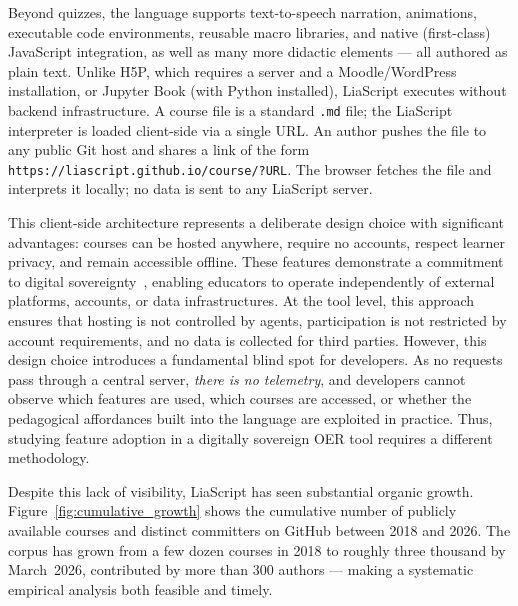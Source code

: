 
Beyond quizzes, the language supports text-to-speech narration, animations,
executable code environments, reusable macro libraries, and native (first-class) JavaScript integration, as well as many more didactic elements --- all authored as plain text.
Unlike H5P, which requires a server and a Moodle/WordPress installation,
or Jupyter Book (with Python installed),
LiaScript executes without backend infrastructure.
A course file is a standard \texttt{.md} file; the LiaScript interpreter
is loaded client-side via a single URL.
An author pushes the file to any public Git host
and shares a link of the form \texttt{https://liascript.github.io/course/?URL}.
The browser fetches the file and interprets it locally;
no data is sent to any LiaScript server.

This client-side architecture represents a deliberate design choice with significant
advantages: courses can be hosted anywhere, require no accounts, respect
learner privacy, and remain accessible offline. These features demonstrate a commitment to digital sovereignty~\cite{SchoenEbner2025,Ebner2026}, enabling educators to operate independently of external platforms, accounts, or data infrastructures. At the tool level, this approach ensures that hosting is not controlled by agents, participation is not restricted by account requirements, and no data is collected for third parties.
However, this design choice introduces a fundamental blind spot for developers. As no requests pass through a central server, \emph{there is no telemetry}, and developers cannot observe which features are used, which courses are
accessed, or whether the pedagogical affordances built into the language
are exploited in practice. Thus, studying feature adoption in a digitally sovereign OER tool requires a different methodology.

Despite this lack of visibility, LiaScript has seen substantial organic
growth.
Figure~\ref{fig:cumulative_growth} shows the cumulative number of publicly
available courses and distinct committers on GitHub between 2018 and 2026.
The corpus has grown from a few dozen courses in 2018 to roughly three
thousand by March~2026, contributed by more than \num{300} authors ---
making a systematic empirical analysis both feasible and timely.

